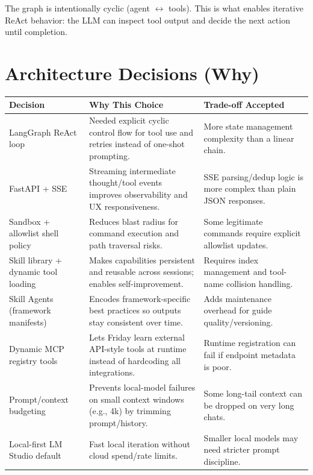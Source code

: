 \documentclass[11pt,a4paper]{article}
\begin{document}
\begin{notebox}
The graph is intentionally cyclic (agent $\leftrightarrow$ tools).  This is what enables iterative ReAct behavior: the LLM can inspect tool output and decide the next action until completion.
\end{notebox}

\section{Architecture Decisions (Why)}

\begin{table}[h!]
\centering
\begin{tabular}{@{}p{3.4cm}p{5.4cm}p{5.0cm}@{}}
\toprule
\textbf{Decision} & \textbf{Why This Choice} & \textbf{Trade-off Accepted} \\
\midrule
LangGraph ReAct loop & Needed explicit cyclic control flow for tool use and retries instead of one-shot prompting. & More state management complexity than a linear chain. \\
FastAPI + SSE & Streaming intermediate thought/tool events improves observability and UX responsiveness. & SSE parsing/dedup logic is more complex than plain JSON responses. \\
Sandbox + allowlist shell policy & Reduces blast radius for command execution and path traversal risks. & Some legitimate commands require explicit allowlist updates. \\
Skill library + dynamic tool loading & Makes capabilities persistent and reusable across sessions; enables self-improvement. & Requires index management and tool-name collision handling. \\
Skill Agents (framework manifests) & Encodes framework-specific best practices so outputs stay consistent over time. & Adds maintenance overhead for guide quality/versioning. \\
Dynamic MCP registry tools & Lets Friday learn external API-style tools at runtime instead of hardcoding all integrations. & Runtime registration can fail if endpoint metadata is poor. \\
Prompt/context budgeting & Prevents local-model failures on small context windows (e.g., 4k) by trimming prompt/history. & Some long-tail context can be dropped on very long chats. \\
Local-first LM Studio default & Fast local iteration without cloud spend/rate limits. & Smaller local models may need stricter prompt discipline. \\
\bottomrule
\end{tabular}
\end{table}
\end{document}
